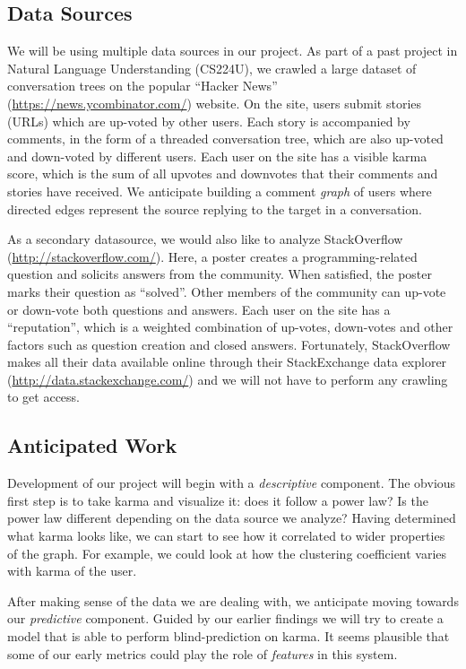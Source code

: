 \documentclass[10pt]{article}
\begin{document}
\subsection{Data Sources}
We will be using multiple data sources in our project. As part of a past project
in Natural Language Understanding (CS224U), we crawled a large dataset of
conversation trees on the popular ``Hacker News''
(\url{https://news.ycombinator.com/}) website. On the site, users submit stories
(URLs) which are up-voted by other users. Each story is accompanied by comments,
in the form of a threaded conversation tree, which are also up-voted and
down-voted by different users. Each user on the site has a visible karma score,
which is the sum of all upvotes and downvotes that their comments and stories
have received.  We anticipate building a comment \textit{graph} of users where
directed edges represent the source replying to the target in a conversation.

As a secondary datasource, we would also like to analyze StackOverflow
(\url{http://stackoverflow.com/}). Here, a poster creates a programming-related
question and solicits answers from the community. When satisfied, the poster
marks their question as ``solved''. Other members of the community can up-vote
or down-vote both questions and answers. Each user on the site has a
``reputation'', which is a weighted combination of up-votes, down-votes and
other factors such as question creation and closed answers. Fortunately,
StackOverflow makes all their data available online through their StackExchange
data explorer (\url{http://data.stackexchange.com/}) and we will not have to
perform any crawling to get access.

\subsection{Anticipated Work}
Development of our project will begin with a \textit{descriptive} component. The
obvious first step is to take karma and visualize it: does it follow a power
law?  Is the power law different depending on the data source we analyze? Having
determined what karma looks like, we can start to see how it correlated to wider
properties of the graph. For example, we could look at how the clustering
coefficient varies with karma of the user.

After making sense of the data we are dealing with, we anticipate moving towards
our \textit{predictive} component. Guided by our earlier findings we will try to
create a model that is able to perform blind-prediction on karma. It seems
plausible that some of our early metrics could play the role of
\textit{features} in this system.
\end{document}
